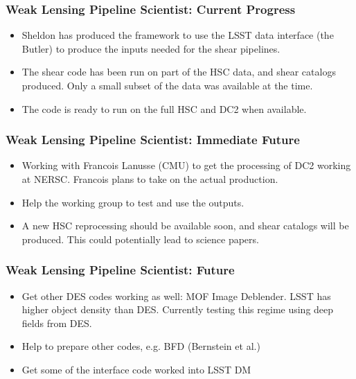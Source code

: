 \documentclass[aspectratio=169]{beamer}
\begin{document}
\frame
{

    \frametitle{Weak Lensing Pipeline Scientist: Current Progress}


    \begin{itemize}

        \item Sheldon has produced the framework to
            use the LSST data interface (the Butler) to
            produce the inputs needed for the shear
            pipelines.

        \item The shear code has been run on part of the HSC data, and shear
            catalogs produced.  Only a small subset of the data was available
            at the time.

        \item The code is ready to run on the full HSC and DC2 when available.

    \end{itemize}
}

\frame
{

    \frametitle{Weak Lensing Pipeline Scientist: Immediate Future}


    \begin{itemize}

        \item Working with Francois Lanusse (CMU) to get the processing
            of DC2 working at NERSC. Francois plans to take on the
            actual production.

        \item Help the working group to test and use the outputs.

        \item A new HSC reprocessing should be available soon, and
            shear catalogs will be produced.  This could 
            potentially lead to science papers.


    \end{itemize}
}

\frame
{

    \frametitle{Weak Lensing Pipeline Scientist: Future}


    \begin{itemize}

        \item Get other DES codes working as well: MOF Image Deblender.  LSST
            has higher object density than DES.  Currently testing this regime
            using deep fields from DES.

        \item Help to prepare other codes, e.g. BFD (Bernstein et al.)

        \item Get some of the interface code worked into LSST DM

    \end{itemize}
}
\end{document}
